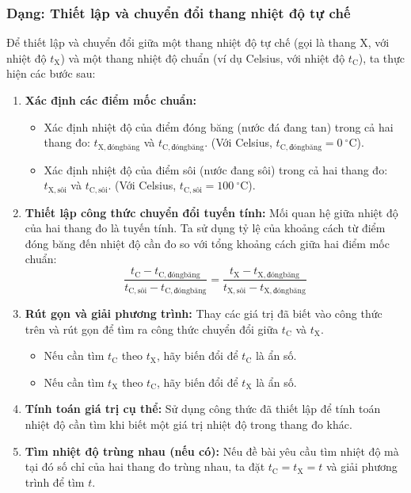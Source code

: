 \subsubsection{Dạng: Thiết lập và chuyển đổi thang nhiệt độ tự chế}
\begin{phuongphap}
	Để thiết lập và chuyển đổi giữa một thang nhiệt độ tự chế (gọi là thang X, với nhiệt độ $t_{\mathrm{X}}$) và một thang nhiệt độ chuẩn (ví dụ Celsius, với nhiệt độ $t_{\mathrm{C}}$), ta thực hiện các bước sau:
	\begin{enumerate}
		\item \textbf{Xác định các điểm mốc chuẩn:}
		\begin{itemize}
			\item Xác định nhiệt độ của điểm đóng băng (nước đá đang tan) trong cả hai thang đo: $t_{\mathrm{X,đóng băng}}$ và $t_{\mathrm{C,đóng băng}}$. (Với Celsius, $t_{\mathrm{C,đóng băng}} = 0\ ^\circ\mathrm{C}$).
			\item Xác định nhiệt độ của điểm sôi (nước đang sôi) trong cả hai thang đo: $t_{\mathrm{X,sôi}}$ và $t_{\mathrm{C,sôi}}$. (Với Celsius, $t_{\mathrm{C,sôi}} = 100\ ^\circ\mathrm{C}$).
		\end{itemize}
		\item \textbf{Thiết lập công thức chuyển đổi tuyến tính:}
		Mối quan hệ giữa nhiệt độ của hai thang đo là tuyến tính. Ta sử dụng tỷ lệ của khoảng cách từ điểm đóng băng đến nhiệt độ cần đo so với tổng khoảng cách giữa hai điểm mốc chuẩn:
		\[
			\dfrac{t_{\mathrm{C}} - t_{\mathrm{C,đóng băng}}}{t_{\mathrm{C,sôi}} - t_{\mathrm{C,đóng băng}}} = \dfrac{t_{\mathrm{X}} - t_{\mathrm{X,đóng băng}}}{t_{\mathrm{X,sôi}} - t_{\mathrm{X,đóng băng}}}
		\]
		\item \textbf{Rút gọn và giải phương trình:}
		Thay các giá trị đã biết vào công thức trên và rút gọn để tìm ra công thức chuyển đổi giữa $t_{\mathrm{C}}$ và $t_{\mathrm{X}}$.
		\begin{itemize}
			\item Nếu cần tìm $t_{\mathrm{C}}$ theo $t_{\mathrm{X}}$, hãy biến đổi để $t_{\mathrm{C}}$ là ẩn số.
			\item Nếu cần tìm $t_{\mathrm{X}}$ theo $t_{\mathrm{C}}$, hãy biến đổi để $t_{\mathrm{X}}$ là ẩn số.
		\end{itemize}
		\item \textbf{Tính toán giá trị cụ thể:}
		Sử dụng công thức đã thiết lập để tính toán nhiệt độ cần tìm khi biết một giá trị nhiệt độ trong thang đo khác.
		\item \textbf{Tìm nhiệt độ trùng nhau (nếu có):}
		Nếu đề bài yêu cầu tìm nhiệt độ mà tại đó số chỉ của hai thang đo trùng nhau, ta đặt $t_{\mathrm{C}} = t_{\mathrm{X}} = t$ và giải phương trình để tìm $t$.
	\end{enumerate}
\end{phuongphap}
